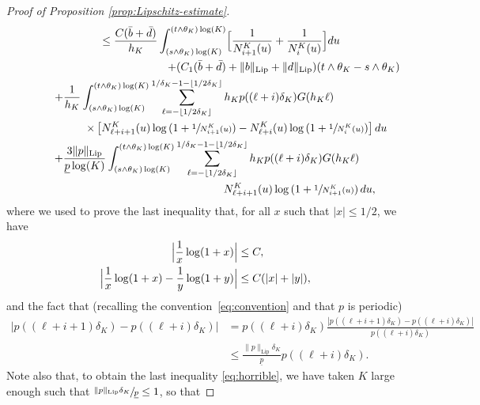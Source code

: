 \documentclass[10pt]{amsart}
\theoremstyle{plain}
\theoremstyle{remark}
\begin{document}
\begin{proof}[Proof of Proposition \ref{prop:Lipschitz-estimate}]
\begin{multline*}
\hspace*{1cm} \leq \frac{C(\bar b+\bar d)}{ h_K}\int_{(s\wedge\theta_K)\log(K)}^{(t\wedge\theta_K)\log(K)}\Bigl[\frac{1}{N^K_{i+1}(u)}+\frac{1}{N^K_{i}(u)}\Bigr]du \\
 \hspace{5cm} +(C_1(\bar b+\bar d)+\|b\|_{\text{Lip}}+\|d\|_{\text{Lip}})(t\wedge \theta_K-s\wedge \theta_K)  \\
\hspace*{-.7cm} +\frac{1}{h_K}\int_{(s\wedge\theta_K)\log(K)}^{(t\wedge\theta_K)\log(K)} \sum_{\ell=-\lfloor 1/2\delta_K\rfloor}^{1/\delta_K-1-\lfloor 1/2\delta_K\rfloor} h_{K} p((\ell+i)\delta_K) G(h_{K}\ell)\\
 \hspace{2cm}\times \left[N_{\ell+i+1}^K(u)\log \left(1+\sfrac{1}{N_{i+1}^K(u)}\right)-N_{\ell+i}^K(u)\log \left(1+\sfrac{1}{N_{i}^K(u)}\right)
\right]du  \\
\hspace*{.1cm} +\frac{3\|p\|_{\text{Lip}}}{\underline{p}\log(K)}\int_{(s\wedge\theta_K)\log(K)}^{(t\wedge\theta_K)\log(K)} \sum_{\ell=-\lfloor 1/2\delta_K\rfloor}^{1/\delta_K-1-\lfloor 1/2\delta_K\rfloor}h_Kp((\ell+i)\delta_K)G(h_K\ell)\\
 \hspace{6cm}N_{\ell+i+1}^K(u)\log \left(1+\sfrac{1}{N_{i+1}^K(u)}\right)du,
\end{multline*}
where we used to prove the last inequality that, for all $x$ such that $|x|\leq 1/2$, we have\vspace*{-3pt}
\begin{align}
\Bigl|\frac{1}{x}\log(1+x)\Bigr|&\leq C,
\label{approxlog3}\\
\Bigl |\frac{1}{x}\log(1+x)-\frac{1}{y}\log(1+y) \Bigr|&\leq C(|x|+|y|),
\label{approxlog4}
\end{align}
and the fact that (recalling the convention~\eqref{eq:convention} and that $p$ is periodic)\vspace*{-3pt}
\begin{align*}%
\left|p((\ell+i+1)\delta_K)-p((\ell+i)\delta_K)\right|&= p((\ell+i)\delta_K)\frac{\left|p((\ell+i+1)\delta_K)-p((\ell+i)\delta_K)\right|}{p((\ell+i)\delta_K)} \\
&\leq\frac{\|p\|_{\text{Lip}}\delta_K}{\underline{p}}p((\ell+i)\delta_K).
\end{align*}
Note also that, to obtain the last inequality \eqref{eq:horrible}, we have taken $K$ large enough such that $\sfrac{\|p\|_{\text{Lip}}\delta_K}{\underline{p}}\leq 1$, so that\vspace*{-3pt}

\end{proof}
\end{document}
